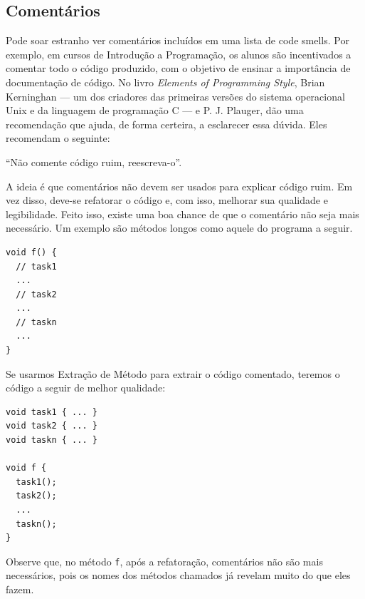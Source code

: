 \documentclass[
  11pt,
  twoside]{book}
\newcommand{\passthrough}[1]{#1}
\renewenvironment{quote}{\centering \vspace{1.5ex} \begin{tcolorbox}[colback=backcolor, width=4.9in]}{\end{tcolorbox}}
\begin{document}
\hypertarget{comentuxe1rios}{%
\subsection{Comentários}\label{comentuxe1rios}}

 

Pode soar estranho ver comentários incluídos em uma lista de code
smells. Por exemplo, em cursos de Introdução a Programação, os alunos
são incentivados a comentar todo o código produzido, com o objetivo de
ensinar a importância de documentação de código. No livro \emph{Elements
of Programming Style}, Brian Kerninghan --- um dos criadores das
primeiras versões do sistema operacional Unix e da linguagem de
programação C --- e P. J. Plauger, dão uma recomendação que ajuda, de
forma certeira, a esclarecer essa dúvida. Eles recomendam o seguinte:

\begin{quote}
``Não comente código ruim, reescreva-o''.
\end{quote}

A ideia é que comentários não devem ser usados para explicar código
ruim. Em vez disso, deve-se refatorar o código e, com isso, melhorar sua
qualidade e legibilidade. Feito isso, existe uma boa chance de que o
comentário não seja mais necessário. Um exemplo são métodos longos como
aquele do programa a seguir.

\begin{lstlisting}
void f() {
  // task1
  ... 
  // task2
  ... 
  // taskn
  ...
}
\end{lstlisting}

Se usarmos Extração de Método para extrair o código comentado, teremos o
código a seguir de melhor qualidade:

\begin{lstlisting}
void task1 { ... }
void task2 { ... }
void taskn { ... }

void f { 
  task1();
  task2();
  ...
  taskn();
}
\end{lstlisting}

Observe que, no método \passthrough{\lstinline!f!}, após a refatoração,
comentários não são mais necessários, pois os nomes dos métodos chamados
já revelam muito do que eles fazem.

\end{document}

